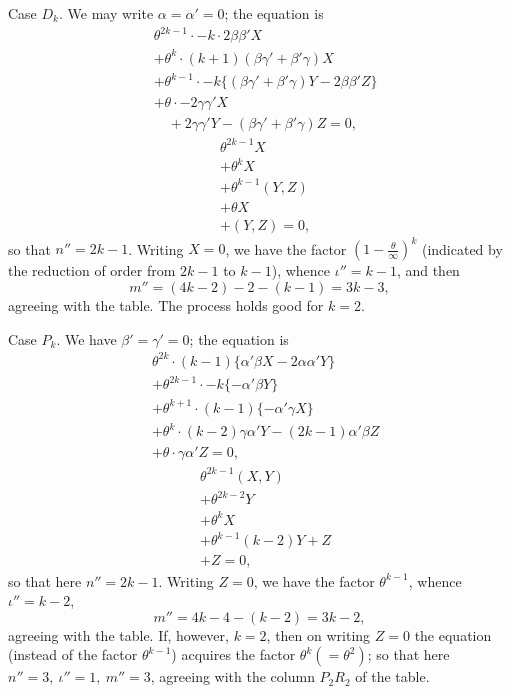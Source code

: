 ﻿\documentclass[11pt,a4paper]{article}
\theoremstyle{plain}
\theoremstyle{definition}
\begin{document}
Case \(D_k\). We may write \(\alpha=\alpha'=0\); the equation is
\[
\begin{aligned}
&\theta^{2k-1}\cdot-k\cdot2\beta\beta'X\\
&+\theta^k\cdot(k+1)(\beta\gamma'+\beta'\gamma)X\\
&+\theta^{k-1}\cdot-k\{(\beta\gamma'+\beta'\gamma)Y-2\beta\beta'Z\}\\
&+\theta\cdot-2\gamma\gamma'X\\
&\quad+2\gamma\gamma'Y-(\beta\gamma'+\beta'\gamma)Z=0,
\end{aligned}
\]
\[
\begin{aligned}
&\theta^{2k-1}X\\
&+\theta^kX\\
&+\theta^{k-1}(Y,Z)\\
&+\theta X\\
&+(Y,Z)=0,
\end{aligned}
\]
so that \(n''=2k-1\). Writing \(X=0\), we have the factor
\((1-\frac{\theta}{\infty})^k\) (indicated by the reduction of order from
\(2k-1\) to \(k-1\)), whence \(\iota''=k-1\), and then
\[
m''=(4k-2)-2-(k-1)=3k-3,
\]
agreeing with the table. The process holds good for \(k=2\).

Case \(P_k\). We have \(\beta'=\gamma'=0\); the equation is
\[
\begin{aligned}
&\theta^{2k}\cdot(k-1)\{\alpha'\beta X-2\alpha\alpha'Y\}\\
&+\theta^{2k-1}\cdot-k\{-\alpha'\beta Y\}\\
&+\theta^{k+1}\cdot(k-1)\{-\alpha'\gamma X\}\\
&+\theta^k\cdot(k-2)\gamma\alpha'Y-(2k-1)\alpha'\beta Z\\
&+\theta\cdot\gamma\alpha'Z=0,
\end{aligned}
\]
\[
\begin{aligned}
&\theta^{2k-1}(X,Y)\\
&+\theta^{2k-2}Y\\
&+\theta^kX\\
&+\theta^{k-1}(k-2)Y+Z\\
&+Z=0,
\end{aligned}
\]
so that here \(n''=2k-1\). Writing \(Z=0\), we have the factor
\(\theta^{k-1}\), whence \(\iota''=k-2\),
\[
m''=4k-4-(k-2)=3k-2,
\]
agreeing with the table. If, however, \(k=2\), then on writing \(Z=0\) the
equation (instead of the factor \(\theta^{k-1}\)) acquires the factor
\(\theta^k(=\theta^2)\); so that here \(n''=3,\ \iota''=1,\ m''=3\),
agreeing with the column \(P_2R_2\) of the table.
\end{document}
